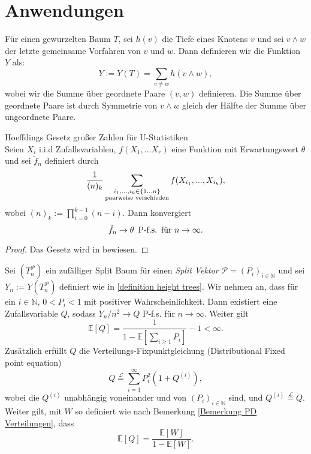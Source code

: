 \chapter{Anwendungen}
\begin{Definition}
    \label{definition height trees}
    Für einen gewurzelten Baum $T$, sei $h(v)$ die Tiefe eines Knotens $v$ und sei $v\wedge w$ der letzte gemeinsame Vorfahren von $v$ und $w$. Dann definieren wir die Funktion $Y$ als:
    \[
        Y := Y(T) = \sum_{v \neq w}h(v \wedge w),
    \]
    wobei wir die Summe über geordnete Paare $(v,w)$ definieren. Die Summe über geordnete Paare ist durch Symmetrie von $v \wedge w$ gleich der Hälfte der Summe über ungeordnete Paare. 
\end{Definition}
\begin{theorem}\textnormal{Hoeffdings Gesetz großer Zahlen für U-Statistiken}\\
    \label{hoeffding theorem}
    Seien $X_i$ i.i.d Zufallsvariablen, $f(X_1,...X_r)$ eine Funktion mit Erwartungswert $\theta$ und sei $\tilde{f}_n$ definiert durch 
    \[
        \frac{1}{(n)_{k}}\sum_{\substack{i_1,...,i_k \in \{1...n\}\\ \textnormal{paarweise verschieden}}}f(X_{i_1},...,X_{i_k}),
    \]
    wobei $(n)_k := \prod_{i=0}^{k-1}(n-i)$.
    Dann konvergiert 
    \[
        \tilde{f}_n  \rightarrow \theta \hspace{5pt} \textnormal{P-f.s.} \hspace{5pt} \textnormal{für } n \rightarrow \infty.
    \]
\begin{proof}
    Das Gesetz wird in \cite{hoeffding1961strong} bewiesen.
\end{proof}
\end{theorem}
\begin{theorem}
    Sei $(T_n^\mathcal{P})$ ein zufälliger Split Baum für einen \textit{Split Vektor} $\mathcal{P} = (P_i)_{i \in \mathbb{N}}$ und sei $Y_n := Y(T^\mathcal{P}_n)$ definiert wie in \ref{definition height trees}. Wir nehmen an, dass für ein $i \in \mathbb{N}$, $0< P_i < 1$ mit positiver Wahrscheinlichkeit. Dann existiert eine Zufallsvariable $Q$, sodass $Y_n/n^2 \rightarrow Q$ P-f.s. für $n \to \infty$. Weiter gilt 
    \begin{equation}
        \label{first equation of Q theorem}
    \mathbb{E}[Q]  = \frac{1}{1-\mathbb{E}[\sum_{i \geq 1}P_i ]}-1 < \infty. 
    \end{equation} 
    Zusätzlich erfüllt $Q$ die Verteilungs-Fixpunktgleichung (Distributional Fixed point equation)
    \begin{equation}
        Q \stackrel{\mathcal{L}}{=} \sum_{i=1}^{\infty}P_i^2(1+Q^{(i)}),
    \end{equation} 
    wobei die $Q^{(i)}$ unabhängig voneinander und von $(P_i)_{i \in \mathbb{N}}$ sind, und $Q^{(i)} \stackrel{\mathcal{L}}{=}Q$. 
    Weiter gilt, mit $W$ so definiert wie nach Bemerkung \ref{Bemerkung PD Verteilungen}, dass 
\begin{equation}
    \mathbb{E}[Q] = \frac{\mathbb{E}[W]}{1 - \mathbb{E}[W]}.
\end{equation}
\end{theorem}
